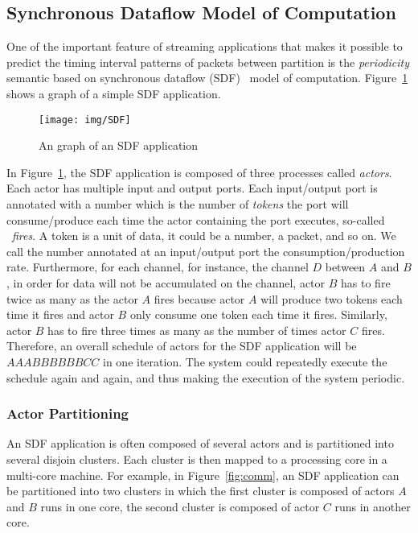 \documentclass[12pt]{article}
\begin{document}
\subsection{Synchronous Dataflow Model of Computation}\label{sec:SDF}
One of the important feature of streaming applications that makes it possible to
predict the timing interval patterns of packets between partition is the
\textit{periodicity} semantic based on synchronous dataflow (SDF)~\cite{LeeSDF}
model of computation. Figure~\ref{fig:SDF} shows a graph of a simple SDF
application.

\begin{figure}[ht!]
\centering
\texttt{[image: img/SDF]}
\caption{An graph of an SDF application}\label{fig:SDF}
\end{figure}

In Figure~\ref{fig:SDF}, the SDF application is composed of three processes
called \textit{actors}. Each actor has multiple input and output ports. Each
input/output port is annotated with a number which is the number of
\textit{tokens} the port will consume/produce each time the actor containing the
port executes, so-called ~\textit{fires}. A token is a unit of data, it could be
a number, a packet, and so on. We call the number annotated at an input/output
port the consumption/production rate. Furthermore, for each channel, for
instance, the channel $D$ between $A$ and $B$, in order for data will not be
accumulated on the channel, actor $B$ has to fire twice as many as the actor $A$
fires because actor $A$ will produce two tokens each time it fires and actor $B$
only consume one token each time it fires. Similarly, actor $B$ has to fire
three times as many as the number of times actor $C$ fires. Therefore, an
overall schedule of actors for the SDF application will be $AAABBBBBBCC$ in one
iteration. The system could repeatedly execute the schedule again and again, and
thus making the execution of the system periodic.

\subsubsection{Actor Partitioning}
An SDF application is often composed of several actors and is partitioned into
several disjoin clusters. Each cluster is then mapped to a processing core in a
multi-core machine. For example, in Figure~\ref{fig:comm}, an SDF application
can be partitioned into two clusters in which the first cluster is composed of
actors $A$ and $B$ runs in one core, the second cluster is composed of actor
$C$ runs in another core.
\end{document}

